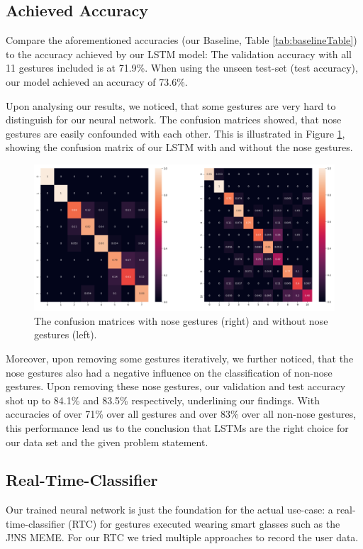 \documentclass[runningheads]{llncs}
\begin{document}
\subsection{Achieved Accuracy}
Compare the aforementioned accuracies (our Baseline, Table \ref{tab:baselineTable}) to the accuracy achieved by our LSTM model:
 The validation accuracy with all 11 gestures included is at 71.9\%. When using the unseen test-set (test accuracy), our model achieved an accuracy of 73.6\%. 
 
 Upon analysing our results, we noticed, that some gestures are very hard to distinguish for our neural network. The confusion matrices showed, that nose gestures are easily confounded with each other. This is illustrated in Figure \ref{fig:confMat}, showing the confusion matrix of our LSTM with and without the nose gestures. 
\begin{figure}
\centering
\includegraphics[width=\textwidth]{confusionMatrices.png}
\caption{The confusion matrices with nose gestures (right) and without nose gestures (left).}
\label{fig:confMat}
\end{figure}
 Moreover, upon removing some gestures iteratively, we further noticed, that the nose gestures also had a negative influence on the classification of non-nose gestures. Upon removing these nose gestures, our validation and test accuracy shot up to 84.1\% and 83.5\% respectively, underlining our findings. With accuracies of over 71\% over all gestures and over 83\% over all non-nose gestures, this performance lead us to the conclusion that LSTMs are the right choice for our data set and the given problem statement. %

\subsection{Real-Time-Classifier}
Our trained neural network is just the foundation for the actual use-case: a real-time-classifier (RTC) for gestures executed wearing smart glasses such as the J!NS MEME. For our RTC we tried multiple approaches to record the user data.
\end{document}
